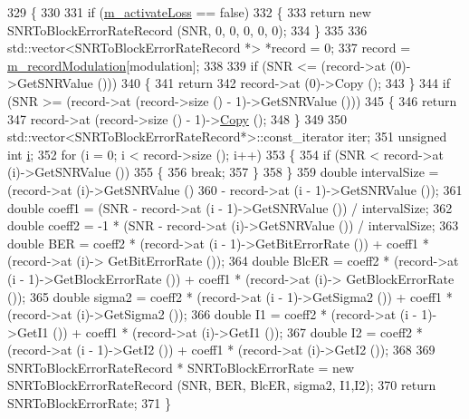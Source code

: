 \begin{DoxyCode}
329 \{
330 
331   \textcolor{keywordflow}{if} (\hyperlink{classns3_1_1SNRToBlockErrorRateManager_ac12a64ac423a9051a6f2cebf82fb3259}{m\_activateLoss} == \textcolor{keyword}{false})
332     \{
333       \textcolor{keywordflow}{return} \textcolor{keyword}{new} SNRToBlockErrorRateRecord (SNR, 0, 0, 0, 0, 0);
334     \}
335 
336   std::vector<SNRToBlockErrorRateRecord *> *record = 0;
337   record = \hyperlink{classns3_1_1SNRToBlockErrorRateManager_af74c812f3b0a25252f2897aadea6898e}{m\_recordModulation}[modulation];
338 
339   \textcolor{keywordflow}{if} (SNR <= (record->at (0)->GetSNRValue ()))
340     \{
341       \textcolor{keywordflow}{return}
342         record->at (0)->Copy ();
343     \}
344   \textcolor{keywordflow}{if} (SNR >= (record->at (record->size () - 1)->GetSNRValue ()))
345     \{
346       \textcolor{keywordflow}{return}
347         record->at (record->size () - 1)->\hyperlink{namespacens3_a952d99f6d759fee74dda19f308451bc1}{Copy} ();
348     \}
349 
350   std::vector<SNRToBlockErrorRateRecord*>::const\_iterator iter;
351   \textcolor{keywordtype}{unsigned} \textcolor{keywordtype}{int} \hyperlink{bernuolliDistribution_8m_a6f6ccfcf58b31cb6412107d9d5281426}{i};
352   \textcolor{keywordflow}{for} (i = 0; i < record->size (); i++)
353     \{
354       \textcolor{keywordflow}{if} (SNR < record->at (i)->GetSNRValue ())
355         \{
356           \textcolor{keywordflow}{break};
357         \}
358     \}
359   \textcolor{keywordtype}{double} intervalSize = (record->at (i)->GetSNRValue ()
360                          - record->at (i - 1)->GetSNRValue ());
361   \textcolor{keywordtype}{double} coeff1 = (SNR - record->at (i - 1)->GetSNRValue ()) / intervalSize;
362   \textcolor{keywordtype}{double} coeff2 = -1 * (SNR - record->at (i)->GetSNRValue ()) / intervalSize;
363   \textcolor{keywordtype}{double} BER = coeff2 * (record->at (i - 1)->GetBitErrorRate ()) + coeff1 * (record->at (i)->
      GetBitErrorRate ());
364   \textcolor{keywordtype}{double} BlcER = coeff2 * (record->at (i - 1)->GetBlockErrorRate ()) + coeff1 * (record->at (i)->
      GetBlockErrorRate ());
365   \textcolor{keywordtype}{double} sigma2 = coeff2 * (record->at (i - 1)->GetSigma2 ()) + coeff1 * (record->at (i)->GetSigma2 ());
366   \textcolor{keywordtype}{double} I1 = coeff2 * (record->at (i - 1)->GetI1 ()) + coeff1 * (record->at (i)->GetI1 ());
367   \textcolor{keywordtype}{double} I2 = coeff2 * (record->at (i - 1)->GetI2 ()) + coeff1 * (record->at (i)->GetI2 ());
368 
369   SNRToBlockErrorRateRecord * SNRToBlockErrorRate = \textcolor{keyword}{new} SNRToBlockErrorRateRecord (SNR, BER, BlcER, sigma2,
       I1,I2);
370   \textcolor{keywordflow}{return} SNRToBlockErrorRate;
371 \}
\end{DoxyCode}


